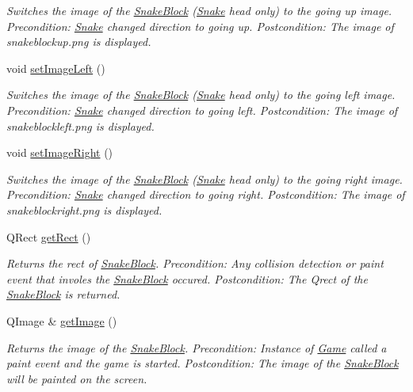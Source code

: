 \begin{DoxyCompactItemize}
\begin{DoxyCompactList}\small\item\em \-Switches the image of the \hyperlink{classSnakeBlock}{\-Snake\-Block} (\hyperlink{classSnake}{\-Snake} head only) to the going up image. \-Precondition\-: \hyperlink{classSnake}{\-Snake} changed direction to going up. \-Postcondition\-: \-The image of snakeblockup.\-png is displayed. \end{DoxyCompactList}\item 
\hypertarget{classSnakeBlock_a3da49d8a5ffd258bffecd0690952590e}{void \hyperlink{classSnakeBlock_a3da49d8a5ffd258bffecd0690952590e}{set\-Image\-Left} ()}\label{classSnakeBlock_a3da49d8a5ffd258bffecd0690952590e}

\begin{DoxyCompactList}\small\item\em \-Switches the image of the \hyperlink{classSnakeBlock}{\-Snake\-Block} (\hyperlink{classSnake}{\-Snake} head only) to the going left image. \-Precondition\-: \hyperlink{classSnake}{\-Snake} changed direction to going left. \-Postcondition\-: \-The image of snakeblockleft.\-png is displayed. \end{DoxyCompactList}\item 
\hypertarget{classSnakeBlock_ad68fd5ae96249925aa85cb76e616c143}{void \hyperlink{classSnakeBlock_ad68fd5ae96249925aa85cb76e616c143}{set\-Image\-Right} ()}\label{classSnakeBlock_ad68fd5ae96249925aa85cb76e616c143}

\begin{DoxyCompactList}\small\item\em \-Switches the image of the \hyperlink{classSnakeBlock}{\-Snake\-Block} (\hyperlink{classSnake}{\-Snake} head only) to the going right image. \-Precondition\-: \hyperlink{classSnake}{\-Snake} changed direction to going right. \-Postcondition\-: \-The image of snakeblockright.\-png is displayed. \end{DoxyCompactList}\item 
\-Q\-Rect \hyperlink{classSnakeBlock_af82087d3749a207105a1e76a6570f8c0}{get\-Rect} ()
\begin{DoxyCompactList}\small\item\em \-Returns the rect of \hyperlink{classSnakeBlock}{\-Snake\-Block}. \-Precondition\-: \-Any collision detection or paint event that involes the \hyperlink{classSnakeBlock}{\-Snake\-Block} occured. \-Postcondition\-: \-The \-Qrect of the \hyperlink{classSnakeBlock}{\-Snake\-Block} is returned. \end{DoxyCompactList}\item 
\-Q\-Image \& \hyperlink{classSnakeBlock_a3f50323a5a4f1991a91d8083bf522b01}{get\-Image} ()
\begin{DoxyCompactList}\small\item\em \-Returns the image of the \hyperlink{classSnakeBlock}{\-Snake\-Block}. \-Precondition\-: \-Instance of \hyperlink{classGame}{\-Game} called a paint event and the game is started. \-Postcondition\-: \-The image of the \hyperlink{classSnakeBlock}{\-Snake\-Block} will be painted on the screen. \end{DoxyCompactList}\end{DoxyCompactItemize}

